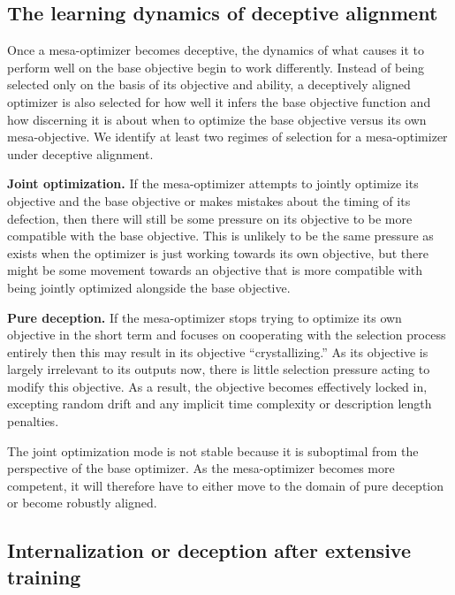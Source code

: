 \documentclass[
  onecolumn,
  natbib,
]{miri-tech-article}
\begin{document}
\subsection{The learning dynamics of deceptive alignment}
\label{sec:4.3}

Once a mesa-optimizer becomes deceptive, the dynamics of what causes it to perform well on the base objective begin to work differently. Instead of being selected only on the basis of its objective and ability, a deceptively aligned optimizer is also selected for how well it infers the base objective function and how discerning it is about when to optimize the base objective versus its own mesa-objective. We identify at least two regimes of selection for a mesa-optimizer under deceptive alignment.

\textbf{Joint optimization.} If the mesa-optimizer attempts to jointly optimize its objective and the base objective or makes mistakes about the timing of its defection, then there will still be some pressure on its objective to be more compatible with the base objective. This is unlikely to be the same pressure as exists when the optimizer is just working towards its own objective, but there might be some movement towards an objective that is more compatible with being jointly optimized alongside the base objective.

\textbf{Pure deception.} If the mesa-optimizer stops trying to optimize its own objective in the short term and focuses on cooperating with the selection process entirely then this may result in its objective ``crystallizing.'' As its objective is largely irrelevant to its outputs now, there is little selection pressure acting to modify this objective. As a result, the objective becomes effectively locked in, excepting random drift and any implicit time complexity or description length penalties.

The joint optimization mode is not stable because it is suboptimal from the perspective of the base optimizer. As the mesa-optimizer becomes more competent, it will therefore have to either move to the domain of pure deception or become robustly aligned.

\subsection{Internalization or deception after extensive training}
\label{sec:4.4}
\end{document}
